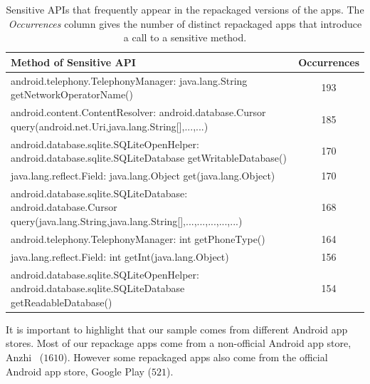 \begin{table}[ht]
  \caption{Sensitive APIs that frequently appear in the repackaged versions of the apps. The
    \emph{Occurrences} column gives the number of distinct repackaged apps that introduce a call
  to a sensitive method.}
\centering
  \begin{tabular}{lc}

    \toprule
    Method of Sensitive API & Occurrences \\
    \midrule
    android.telephony.TelephonyManager: java.lang.String getNetworkOperatorName() &  193\\
    android.content.ContentResolver: android.database.Cursor query(android.net.Uri,java.lang.String[],...,...) &  185 \\
    android.database.sqlite.SQLiteOpenHelper: android.database.sqlite.SQLiteDatabase getWritableDatabase() &  170 \\
    java.lang.reflect.Field: java.lang.Object get(java.lang.Object) &  170 \\
    android.database.sqlite.SQLiteDatabase: android.database.Cursor query(java.lang.String,java.lang.String[],...,...,...,...,...) &  168 \\
    android.telephony.TelephonyManager: int getPhoneType() &  164\\
    java.lang.reflect.Field: int getInt(java.lang.Object) &  156\\
    android.database.sqlite.SQLiteOpenHelper: android.database.sqlite.SQLiteDatabase getReadableDatabase() &  154\\
\bottomrule
\end{tabular}
\label{tab:APIused}
\end{table}












It is important to highlight that our sample comes
from different Android app stores. Most of our repackage apps come from a non-official
Android app store, Anzhi~\cite{anzhi} ($1610$). However some repackaged apps also come from the
official Android app store, Google Play ($521$).


